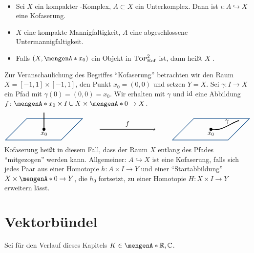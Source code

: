 \begin{beispiel}
\mbox{ }
\begin{itemize}
	\item Sei $X$ ein kompakter \CW-Komplex, $A \subset X$ ein Unterkomplex. Dann ist $\iota \colon A \hookrightarrow X$ eine Kofaserung.
	\item $X$ eine kompakte Mannigfaltigkeit, $A$ eine abgeschlossene Untermannigfaltigkeit.
	\item Falls $(X, \set{x_0})$ ein Objekt in $\textsc{Top}^2_{\mathrm{Kof}}$ ist, dann heißt $X$ .
\end{itemize}	
\end{beispiel}

Zur Veranschaulichung des Begriffes \enquote{Kofaserung} betrachten wir den Raum
$X= [-1,1] \times [-1,1]$, den Punkt $x_0=(0,0)$ und setzen $Y=X$. Sei $\gamma \colon I \to X$ ein Pfad mit $\gamma(0)= (0,0)=x_0$. Wir erhalten mit $\gamma$ und $\operatorname{id}$ eine 
Abbildung $f \colon \set{x_0} \times I \cup  X \times \set{0} \to X$.
\[
	\begin{tikzpicture}[scale=1.5]
		\draw[DodgerBlue4,thick] (1,0,1) -- (1,0,-1) -- (-1,0,-1) -- (-1,0,1) -- cycle;
		\draw[very thick,fill] (0,0,0) circle[radius=0.04] node[below]{$x_0$} -- (0,0.6,0);
		
		\draw[-to,thick] (2,0) -- (4,0) node[midway,above]{$f$};
		
		\draw[DodgerBlue4,thick] (7,0,1) -- (7,0,-1) -- (5,0,-1) -- (5,0,1) -- cycle;
		\draw[very thick] (6,0,0) node[below]{$x_0$} .. controls +(-15:0.4) and +(185:0.2) .. (6.7,0,-0.8) node[midway,above,xshift=0.2]{$\gamma$};
		\filldraw[very thick] (6,0,0) circle[radius=0.04];
	\end{tikzpicture}
\]
Kofaserung heißt in diesem Fall, dass der Raum $X$ entlang des Pfades \enquote{mitgezogen} werden kann. Allgemeiner: $A \hookrightarrow X$ ist eine Kofaserung, falls sich 
jedes Paar aus einer Homotopie $h \colon A \times I \to Y$ und einer \enquote{Startabbildung} $X \times \set{0} \to Y$, die $h_0$ fortsetzt, zu einer Homotopie 
$H \colon X \times I \to Y$ erweitern lässt.
\newpage

\section{Vektorbündel} %
\label{sec:2}
Sei für den Verlauf dieses Kapitels $K \in \set{\mathds{R},\mathds{C}}$. 

